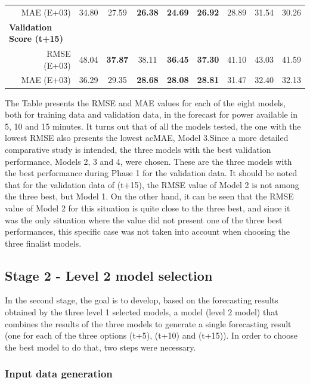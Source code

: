 \begin{table}[htbp]
\begin{tabular}{cr|cccccccc}
          & MAE (E+03) & 34.80 & 27.59 & \textbf{26.38} & \textbf{24.69} & \textbf{26.92} & 28.89 & 31.54 & 30.26 \\
    \multicolumn{2}{l|}{\textbf{Validation Score (t+15)}} &       &       &       &       &       &       &       &  \\
          & RMSE (E+03) & 48.04 & \textbf{37.87} & 38.11 & \textbf{36.45} & \textbf{37.30} & 41.10 & 43.03 & 41.59 \\
          & MAE (E+03) & 36.29 & 29.35 & \textbf{28.68} & \textbf{28.08} & \textbf{28.81} & 31.47 & 32.40 & 32.13 \\
    \end{tabular}%
  \label{valres}%
\end{table}%


The Table presents the \ac{RMSE} and \ac{MAE} values for each of the eight models, both for training data and validation data, in the forecast for power available in 5, 10 and 15 minutes. It turns out that of all the models tested, the one with the lowest \ac{RMSE} also presents the lowest ac{MAE}, Model 3.Since a more detailed comparative study is intended, the three models with the best validation performance, Models 2, 3 and 4, were chosen. These are the three models with the best performance during Phase 1 for the validation data. It should be noted that for the validation data of (t+15), the \ac{RMSE} value of Model 2 is not among the three best, but Model 1. On the other hand, it can be seen that the \ac{RMSE} value of Model 2 for this situation is quite close to the three best, and since it was the only situation where the value did not present one of the three best performances, this specific case was not taken into account when choosing the three finalist models.



\subsection{Stage 2 - Level 2 model selection}

In the second stage, the goal is to develop, based on the forecasting results obtained by the three level 1 selected models, a model (level 2 model) that combines the results of the three models to generate a single forecasting result (one for each of the three options (t+5), (t+10) and (t+15)). In order to choose the best model to do that, two steps were necessary.

\subsubsection{Input data generation}

